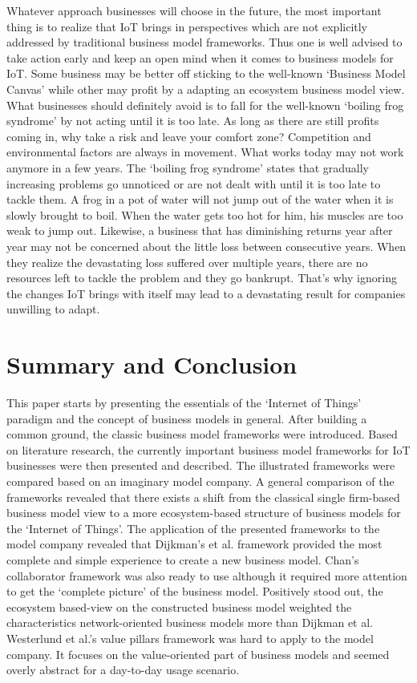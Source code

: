 		Whatever approach businesses will choose in the future, the most important thing is to realize that IoT brings in perspectives which are not explicitly addressed by traditional business model frameworks. Thus one is well advised to take action early and keep an open mind when it comes to business models for IoT. Some business may be better off sticking to the well-known `Business Model Canvas' while other may profit by a adapting an ecosystem business model view. What businesses should definitely avoid is to fall for the well-known `boiling frog syndrome' by not acting until it is too late. As long as there are still profits coming in, why take a risk and leave your comfort zone? Competition and environmental factors are always in movement. What works today may not work anymore in a few years. The `boiling frog syndrome' states that gradually increasing problems go unnoticed or are not dealt with until it is too late to tackle them. A frog in a pot of water will not jump out of the water when it is slowly brought to boil. When the water gets too hot for him, his muscles are too weak to jump out. Likewise, a business that has diminishing returns year after year may not be concerned about the little loss between consecutive years. When they realize the devastating loss suffered over multiple years, there are no resources left to tackle the problem and they go bankrupt. That's why ignoring the changes IoT brings with itself may lead to a devastating result for companies unwilling to adapt.

\section{Summary and Conclusion}
\label{sec:summary}

	This paper starts by presenting the essentials of the `Internet of Things' paradigm and the concept of business models in general. After building a common ground, the classic business model frameworks were introduced. Based on literature research, the currently important business model frameworks for IoT businesses were then presented and described. The illustrated frameworks were compared based on an imaginary model company. A general comparison of the frameworks revealed that there exists a shift from the classical single firm-based business model view to a more ecosystem-based structure of business models for the `Internet of Things'. The application of the presented frameworks to the model company revealed that Dijkman's et al. framework provided the most complete and simple experience to create a new business model. Chan's collaborator framework was also ready to use although it required more attention to get the `complete picture' of the business model. Positively stood out, the ecosystem based-view on the constructed business model weighted the characteristics network-oriented business models more than Dijkman et al. Westerlund et al.'s value pillars framework was hard to apply to the model company. It focuses on the value-oriented part of business models and seemed overly abstract for a day-to-day usage scenario. 

